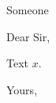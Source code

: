 \documentclass{letter}
\begin{document}
\begin{letter}{Someone}\opening{Dear Sir,} Text $x$. \closing{Yours,}\end{letter}
\end{document}

